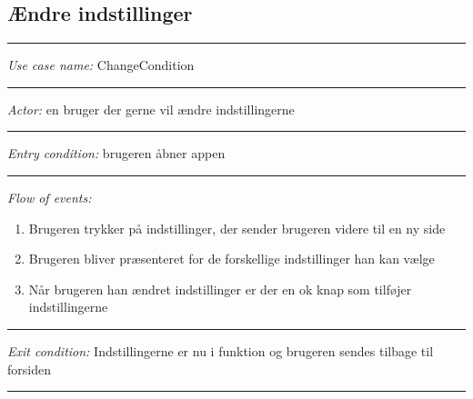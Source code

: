 \documentclass[12pt]{article}
\begin{document}
\subsection*{Ændre indstillinger}
\hrule\vspace{5mm}
\textit{Use case name:} ChangeCondition\\
\hrule\vspace{5mm}
\textit{Actor:} en bruger der gerne vil ændre indstillingerne\\
\hrule\vspace{5mm}
\textit{Entry condition:} brugeren åbner appen\\
\hrule\vspace{5mm}
\textit{Flow of events:}
\begin{enumerate}
\item Brugeren trykker på indstillinger, der sender brugeren videre til en ny side
\item Brugeren bliver præsenteret for de forskellige indstillinger han kan vælge
\item Når brugeren han ændret indstillinger er der en ok knap som tilføjer indstillingerne
\end{enumerate}
\hrule\vspace{5mm}
\textit{Exit condition:} Indstillingerne er nu i funktion og brugeren sendes tilbage til forsiden\\
\hrule\vspace{5mm}
\pagebreak
\end{document}
